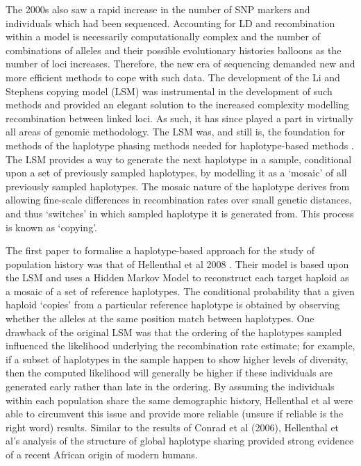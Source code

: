 The 2000s also saw a rapid increase in the number of SNP markers and individuals which had been sequenced. Accounting for LD and recombination within a model is necessarily computationally complex and the number of combinations of alleles and their possible evolutionary histories balloons as the number of loci increases. Therefore, the new era of sequencing demanded new and more efficient methods to cope with such data. The development of the Li and Stephens copying model (LSM) \cite{Li2003} was instrumental in the development of such methods \cite{song2016li} and provided an elegant solution to the increased complexity modelling recombination between linked loci. As such, it has since played a part in virtually all areas of genomic methodology. The LSM was, and still is, the foundation for methods of the haplotype phasing methods needed for haplotype-based methods \cite{stephens2003comparison, stephens2005accounting}. The LSM provides a way to generate the next haplotype in a sample, conditional upon a set of previously sampled haplotypes, by modelling it as a `mosaic' of all previously sampled haplotypes. The mosaic nature of the haplotype derives from allowing fine-scale differences in recombination rates over small genetic distances, and thus `switches' in which sampled haplotype it is generated from. This process is known as `copying'. 

The first paper to formalise a haplotype-based approach for the study of population history was that of Hellenthal et al 2008 \cite{hellenthal2008inferring}. Their model is based upon the LSM and uses a Hidden Markov Model to reconstruct each target haploid as a mosaic of a set of reference haplotypes. The conditional probability that a given haploid `copies' from a particular reference haplotype is obtained by observing whether the alleles at the same position match between haplotypes. One drawback of the original LSM was that the ordering of the haplotypes sampled influenced the likelihood underlying the recombination rate estimate; for example, if a subset of haplotypes in the sample happen to show higher levels of diversity, then the computed likelihood will generally be higher if these individuals are generated early rather than late in the ordering. By assuming the individuals within each population share the same demographic history, Hellenthal et al were able to circumvent this issue and provide more reliable (unsure if reliable is the right word) results. Similar to the results of Conrad et al (2006), Hellenthal et al's analysis of the structure of global haplotype sharing provided strong evidence of a recent African origin of modern humans.

